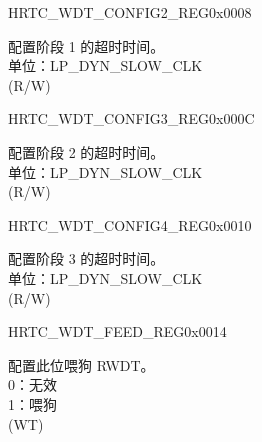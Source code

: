 \begin{register}{H}{RTC\_WDT\_CONFIG2\_REG}{0x0008}\label{regdesc:RTCWDTCONFIG2REG}
%
\regnewline%
\begin{regdesc}\begin{reglist}
\label{fielddesc:RTCWDTSTG1HOLD}\item [RTC\_WDT\_STG1\_HOLD] 配置阶段 1 的超时时间。\\
单位：LP\_DYN\_SLOW\_CLK  \\ (R/W)
\end{reglist}\end{regdesc}
\end{register}


\begin{register}{H}{RTC\_WDT\_CONFIG3\_REG}{0x000C}\label{regdesc:RTCWDTCONFIG3REG}
%
\regnewline%
\begin{regdesc}\begin{reglist}
\label{fielddesc:RTCWDTSTG2HOLD}\item [RTC\_WDT\_STG2\_HOLD] 配置阶段 2 的超时时间。\\
单位：LP\_DYN\_SLOW\_CLK  \\ (R/W)
\end{reglist}\end{regdesc}
\end{register}


\begin{register}{H}{RTC\_WDT\_CONFIG4\_REG}{0x0010}\label{regdesc:RTCWDTCONFIG4REG}
%
\regnewline%
\begin{regdesc}\begin{reglist}
\label{fielddesc:RTCWDTSTG3HOLD}\item [RTC\_WDT\_STG3\_HOLD] 配置阶段 3 的超时时间。\\
单位：LP\_DYN\_SLOW\_CLK  \\ (R/W)
\end{reglist}\end{regdesc}
\end{register}


\begin{register}{H}{RTC\_WDT\_FEED\_REG}{0x0014}\label{regdesc:RTCWDTFEEDREG}
%
%
\regnewline%
\begin{regdesc}\begin{reglist}
\label{fielddesc:RTCWDTFEED}\item [RTC\_WDT\_FEED] 配置此位喂狗 RWDT。\\
0：无效 \\
1：喂狗  \\ (WT)
\end{reglist}\end{regdesc}
\end{register}


